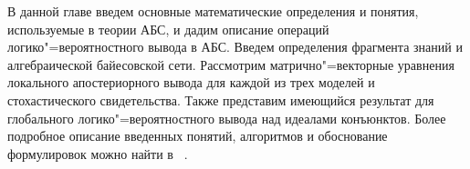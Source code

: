 В данной главе введем основные математические определения и понятия, используемые в теории АБС, и дадим описание операций логико"=вероятностного вывода в АБС. Введем определения фрагмента знаний и алгебраической байесовской сети. Рассмотрим матрично"=векторные уравнения локального апостериорного вывода для каждой из трех моделей и стохастического свидетельства. Также представим имеющийся результат для глобального логико"=вероятностного вывода над идеалами конъюнктов. Более подробное описание введенных понятий, алгоритмов и обоснование формулировок можно найти в ~\cite{ 76, 91, 84,  184, 109, 1, 122, 284, 70}.
